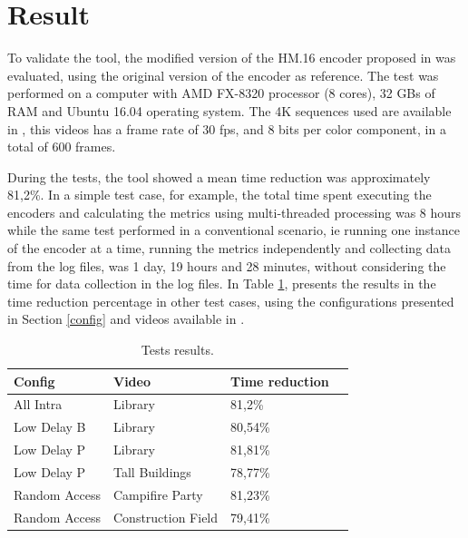 \documentclass[journal]{IEEEtran}
\begin{document}

\section{Result}

To validate the tool, the modified version of the HM.16 encoder proposed in \cite{oliveira:16} was evaluated, using the original version of the encoder as reference. The test was performed on a computer with AMD FX-8320 processor (8 cores), 32 GBs of RAM and Ubuntu 16.04 operating system. The 4K sequences used are available in \cite{sjtu:17}, this videos has a frame rate of 30 fps, and 8 bits per color component, in a total of 600 frames.

During the tests, the tool showed a mean time reduction was approximately 81,2\%. In a simple test case, for example, the total time spent executing the encoders and calculating the metrics using multi-threaded processing was 8  hours while the same test performed in a conventional scenario, ie running one instance of the encoder at a time, running the metrics independently and collecting data from the log files, was 1 day, 19 hours and 28 minutes, without considering the time for data collection in the log files. In Table \ref{tests_configs}, presents the results in the time reduction percentage in other test cases, using the configurations presented in Section \ref{config} and videos available in \cite{sjtu:17}.


\FloatBarrier
\begin{table}[!ht]
\centering
\caption{Tests results.}
\label{tests_configs}
\renewcommand*{\arraystretch}{1.5}
\small

\begin{tabular}{|l|l|l|l|}
\hline
\textbf{Config}				& \textbf{Video} 		&		\textbf{Time reduction}		\\ \hline
All Intra					& Library				&		81,2\%						\\ \hline
Low Delay B					& Library				&		80,54\%						\\ \hline
Low Delay P					& Library				&		81,81\%						\\ \hline
Low Delay P					& Tall Buildings		&		78,77\%						\\ \hline
Random Access				& Campifire Party		&		81,23\%						\\ \hline
Random Access				& Construction Field	&		79,41\%						\\ \hline

\end{tabular}
\end{table}
\FloatBarrier
\end{document}
